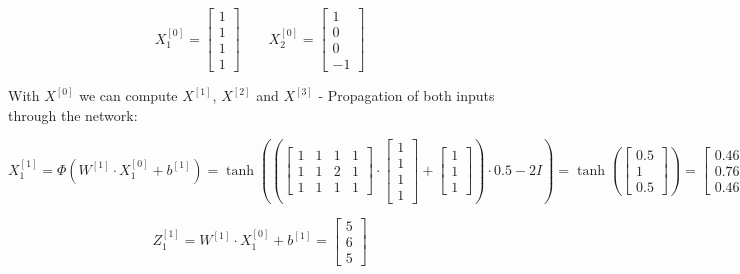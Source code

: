 \documentclass{article}
\begin{document}
\[ X^{[0]}_1 = \begin{bmatrix} 1 \\ 1 \\ 1 \\ 1  \end{bmatrix} \qquad X^{[0]}_2 = \begin{bmatrix} 1 \\ 0 \\ 0 \\ -1  \end{bmatrix} \]

With $X^{[0]}$ we can compute $X^{[1]}$, $X^{[2]}$ and $X^{[3]}$ - Propagation of both inputs through the network:

\[ X^{[1]}_1 = \Phi(W^{[1]} \cdot X^{[0]}_1 + b^{[1]}) = \tanh \left( \left(\begin{bmatrix} 1 & 1 & 1 & 1 \\ 1 & 1 & 2 & 1 \\ 1 & 1 & 1 & 1 \end{bmatrix} \cdot \begin{bmatrix} 1 \\ 1 \\ 1 \\ 1 \end{bmatrix} + \begin{bmatrix} 1 \\ 1 \\ 1 \end{bmatrix} \right) \cdot 0.5 - 2I \right) = \tanh \left( \begin{bmatrix} 0.5 \\ 1 \\ 0.5 \end{bmatrix} \right)  = \begin{bmatrix} 0.46212 \\ 0.76159 \\ 0.46212 \end{bmatrix} \]

\[ Z^{[1]}_1 = W^{[1]} \cdot X^{[0]}_1 + b^{[1]} = \begin{bmatrix} 5 \\ 6 \\ 5 \end{bmatrix} \]
\end{document}
